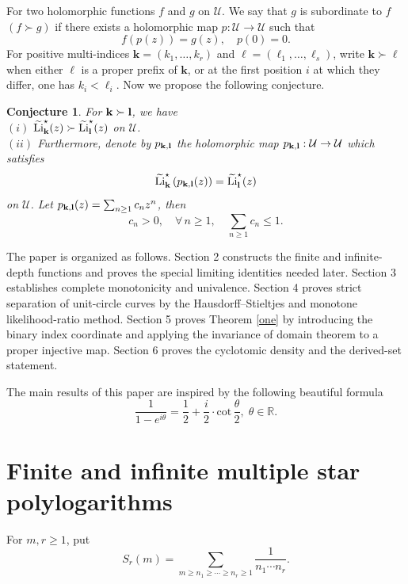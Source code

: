 \documentclass[12pt,a4paper]{amsart}
\numberwithin{equation}{section}
\theoremstyle{plain}
\newtheorem{conj}[Thm]{Conjecture}
\theoremstyle{definition}
\begin{document}
         For two holomorphic functions $f$ and $g$ on $\mathcal{U}$. We say that $g$ is subordinate to $f$ $(f\succ g)$ if there exists a       
                 holomorphic map $p: \mathcal{U}\rightarrow \mathcal{U}$ such that
                 \[
                 f(p(z))=g(z),\quad p(0)=0.
                 \]
               For positive multi-indices
$\mathbf k=(k_1,\ldots,k_r)$ and
$\boldsymbol\ell=(\ell_1,\ldots,\ell_s)$, write
$\mathbf k\succ\boldsymbol\ell$ when either $\boldsymbol\ell$ is a proper prefix of $\mathbf k$, or
 at the first position $i$ at which they differ, one has
       $k_i<\ell_i$. Now we propose the following conjecture.
       \begin{conj} For ${\bf k}\succ {\bf l}$, we have\\
              $(i)$  $\widetilde{\mathrm{Li}}^{\star}_{{\bf k}}(z) \succ  \widetilde{\mathrm{Li}}^{\star}_{{\bf l}}(z)    $ on $\mathcal{U}$. \\
      $(ii)$ Furthermore, denote by $p_{{\bf k},{\bf l}}$  the holomorphic map $p_{{\bf k},{\bf l}}: \mathcal{U}\rightarrow \mathcal{U} $ which satisfies 
       \[
        \widetilde{\mathrm{Li}}^{\star}_{{\bf k}}\left( p_{{\bf k},{\bf l}}(z)\right) = \widetilde{\mathrm{Li}}^{\star}_{{\bf l}}(z)        \]
        on $\mathcal{U}$. Let 
        \(
        p_{{\bf k},{\bf l}} (z) =\sum_{n\geq 1} c_n z^n\), then 
        \[
        c_n>0,\quad \forall\, n\geq 1,\quad \sum_{n\geq 1} c_n\leq 1.
        \]
       \end{conj}

 

The paper is organized as follows.  Section 2 constructs the finite and infinite-depth functions and proves the special limiting identities needed later.  Section 3 establishes complete monotonicity and univalence.  Section 4 proves strict separation of unit-circle curves by the Hausdorff--Stieltjes and monotone likelihood-ratio method.  Section 5 proves Theorem \ref{one} by introducing the binary index coordinate and applying the invariance of domain theorem to a proper injective map.  Section 6 proves the cyclotomic density and the derived-set statement.

The main results of this paper are inspired by the following beautiful formula
  \[
  \frac{1}{1-e^{i\theta}}=\frac{1}{2}+\frac{i}{2}\cdot \mathrm{cot}\,\frac{\theta}{2}, \;\theta\in\mathbb{R}.
  \]

\section{Finite and infinite multiple star polylogarithms}\label{sec:limits}
For $m,r\geq 1$, put
\[
S_r(m)=\sum_{m\geq n_1\geq\cdots\geq n_r\geq 1}
\frac{1}{n_1\cdots n_r}.
\]
\end{document}

